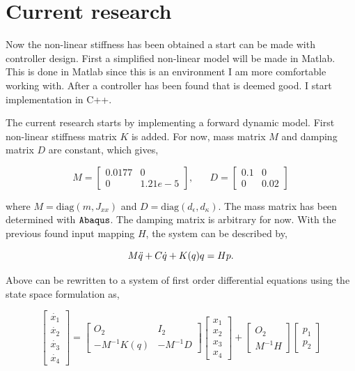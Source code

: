 \section{Current research}

Now the non-linear stiffness has been obtained a start can be made with controller design. First a simplified non-linear model will be made in Matlab. This is done in Matlab since this is an environment I am more comfortable working with. After a controller has been found that is deemed good. I start implementation in C++.

The current research starts by implementing a forward dynamic model. First non-linear stiffness matrix $K$ is added. For now, mass matrix $M$ and damping matrix $D$ are constant, which gives,

\begin{equation}
    M = \begin{bmatrix} 0.0177 & 0 \\ 0 & 1.21e-5 \end{bmatrix}  ,  \hspace{20pt}  D = \begin{bmatrix} 0.1 & 0 \\ 0 & 0.02 \end{bmatrix} 
\end{equation}

where $M = \text{diag}(m, J_{xx})$ and $D = \text{diag}(d_\epsilon,d_\kappa)$. The mass matrix has been determined with $\verb+Abaqus+$. The damping matrix is arbitrary for now. With the previous found input mapping $H$, the system can be described by,

\begin{equation}
    M\Ddot{q} + C\dot{q} + K(q)q = Hp.
\end{equation}

Above can be rewritten to a system of first order differential equations using the state space formulation as,


\begin{equation}
     \begin{bmatrix} \dot{x_1} \\ \dot{x_2} \\\dot{x_3}  \\ \dot{x_4}  \end{bmatrix}   =      \begin{bmatrix} O_2 & I_2 \\ -M^{-1}K(q)  & -M^{-1}D \end{bmatrix}      \begin{bmatrix} x_1\\ x_2 \\x_3\\ x_4 \end{bmatrix}  +      \begin{bmatrix} O_2 \\ M^{-1}H   \end{bmatrix}       \begin{bmatrix} p_1\\ p_2   \end{bmatrix} 
\end{equation}

